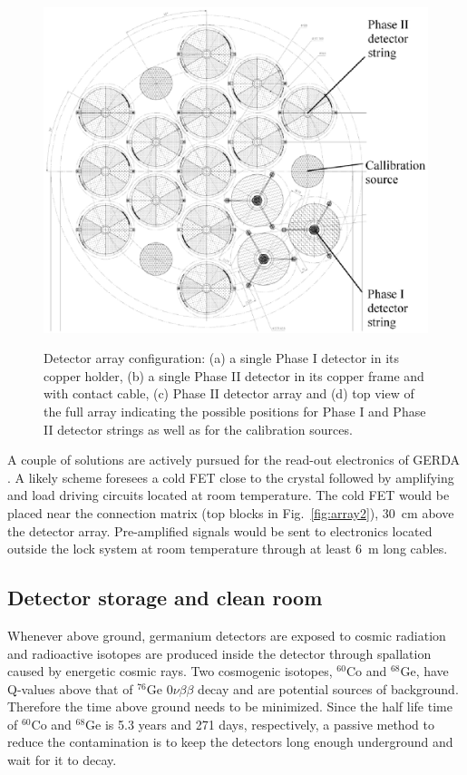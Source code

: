 \begin{figure}[tbhp]
{\includegraphics[height=0.23\textheight]{arrayTop}}%
\caption{Detector array configuration: (a) a single Phase I detector in its copper holder, (b) a single Phase II detector in its copper frame and with contact cable, (c) Phase II detector array and (d) top view of the full array indicating the possible positions for     Phase I and Phase II detector strings as well as for the calibration sources.}
\label{fig:array}
\end{figure}

A couple of solutions are actively pursued for the read-out electronics of GERDA \cite{Cat07}. A likely scheme foresees a cold FET close to the crystal followed by amplifying and load driving circuits located at room temperature. The cold FET would be placed near the connection matrix (top blocks in Fig.~\ref{fig:array2}), 30~cm above the detector array. Pre-amplified signals would be sent to electronics located outside the lock system at room temperature through at least 6~m long cables.

\subsection{Detector storage and clean room}
\label{sec:gerda:source}
Whenever above ground, germanium detectors are exposed to cosmic radiation and radioactive isotopes are produced inside the detector through spallation caused by energetic cosmic rays. Two cosmogenic isotopes, $^{60}$Co and $^{68}$Ge, have Q-values above that of $^{76}$Ge $0\nu\beta\beta$ decay and are potential sources of background. Therefore the time above ground needs to be minimized. Since the half life time of $^{60}$Co and $^{68}$Ge is 5.3 years and 271 days, respectively, a passive method to reduce the contamination is to keep the detectors long enough underground and wait for it to decay.

